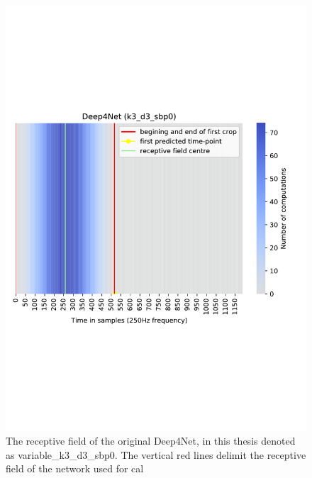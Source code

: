 \begin{figure}
\centering
\includegraphics[width=\linewidth]{img/ch3/deep4net-receptive-field}
\caption{The receptive field of the original Deep4Net, in this thesis denoted as {variable}\_k3\_d3\_sbp0. The vertical red lines delimit the receptive field of the network used for cal}
\label{fig:receptive-field}
\end{figure}


